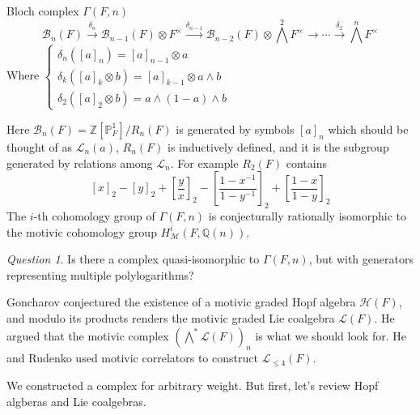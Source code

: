 \documentclass[8pt]{beamer}
\theoremstyle{definition}
\theoremstyle{remark}
\newtheorem*{question}{Question}
\begin{document}
\begin{frame}[t]{Bloch complex $\Gamma(F,n)$}
$$
\mathcal B_n(F)\xrightarrow{\delta_n}\mathcal B_{n-1}(F)\otimes F^\times\xrightarrow{\delta_{n-1}}\mathcal B_{n-2}(F)\otimes \textstyle\bigwedge^2F^\times\to\cdots\xrightarrow{\delta_2}\textstyle\bigwedge^nF^\times
$$
Where $\begin{cases}\delta_n([a]_n)=[a]_{n-1}\otimes a \\ \delta_k([a]_k\otimes b)=[a]_{k-1}\otimes a\wedge b \\ \delta_2([a]_2\otimes b)=a\wedge(1-a)\wedge b\end{cases}$

Here $\mathcal B_n(F)=\mathbb Z[\mathbb P_F^1]/R_n(F)$ is generated by symbols $[a]_n$ which should be thought of as $\mathcal L_n(a)$, $R_n(F)$ is inductively defined, and it is the subgroup generated by relations among $\mathcal L_n$. For example $R_2(F)$ contains
$$
[x]_2-[y]_2+\left[\frac{y}{x}\right]_2-\left[\frac{1-x^{-1}}{1-y^{-1}}\right]_2+\left[\frac{1-x}{1-y}\right]_2
$$
The $i$-th cohomology group of $\Gamma(F,n)$ is conjecturally rationally isomorphic to the motivic cohomology group $H^i_{\mathcal M}(F,\mathbb Q(n))$.

\begin{question}
Is there a complex quasi-isomorphic to $\Gamma(F,n)$, but with generators representing multiple polylogarithms?
\end{question}

Goncharov conjectured the existence of a motivic graded Hopf algebra $\mathcal H(F)$, and modulo its products renders the motivic graded Lie coalgebra $\mathcal L(F)$. He argued that the motivic complex $(\bigwedge^*\mathcal L(F))_n$ is what we should look for. He and Rudenko used motivic correlators to construct $\mathcal L_{\leq 4}(F)$.
\vspace{10pt}

We constructed a complex for arbitrary weight. But first, let's review Hopf algberas and Lie coalgebras.
\end{frame}
\end{document}
